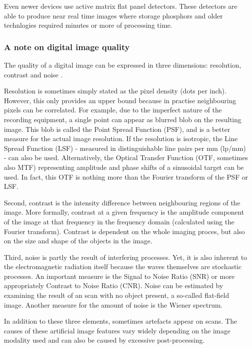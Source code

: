 Even newer devices use active matrix flat panel detectors. These detectors are
able to produce near real time images where storage phosphors and older
technlogies required minutes or more of processing time. %

\subsubsection{A note on digital image quality}
The quality of a digital image can be expressed in three dimensions: resolution,
contrast and noise \cite{suetens}.

Resolution is sometimes simply stated as the pixel density (dots per inch).
However, this only provides an upper bound because in practise neighbouring
pixels can be correlated. For example, due to the imperfect nature of the
recording equipment, a single point can appear as blurred blob on the resulting
image. This blob is called the Point Spread Function (PSF), and is a better
measure for the actual image resolution. If the resolution is isotropic, the
Line Spread Function (LSF) - measured in distinguishable line pairs per mm
(lp/mm) - can also be used. Alternatively, the Optical Transfer Function (OTF,
sometimes also MTF) representing amplitude and phase shifts of a sinusoidal
target can be used. In fact, this OTF is nothing more than the Fourier transform
of the PSF or LSF.

Second, contrast is the intensity difference between neighbouring regions of the
image. More formally, contrast at a given frequency is the amplitude component
of the image at that frequency in the frequency domain (calculated using the
Fourier transform). Contrast is dependent on the whole imaging proces, but also
on the size and shape of the objects in the image.

Third, noise is partly the result of interfering processes. Yet, it is also
inherent to the electromagnetic radiation itself because the waves themselves
are stochastic processes. An important measure is the Signal to Noise Ratio
(SNR) or more appropriately Contrast to Noise Ratio (CNR). Noise can be
estimated by examining the result of an scan with no object present, a so-called
flat-field image. Another measure for the amount of noise is the Wiener
spectrum.

In addition to these three elements, sometimes artefacts appear on scans. The
causes of these artificial image features vary widely depending on the image
modality used and can also be caused by excessive post-processing.

